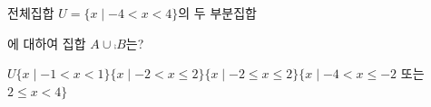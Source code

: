 전체집합 $U=\{x \mid -4<x<4\}$의 두 부분집합\par\smallskip{}\par{}\par\smallskip\noindent 에 대하여 집합 $A\cup\comp{B}$는?
\begin{choicesii}{$U$}{$\{x \mid -1<x<1\}$}{$\{x \mid -2<x\le 2\}$}{$\{x \mid -2\le x\le 2\}$}{$\{x \mid -4<x\le -2$ 또는 $2\le x<4\}$}\end{choicesii}
